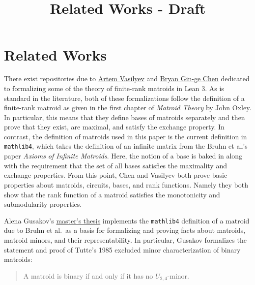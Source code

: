 \documentclass[sigplan,10pt,anonymous,review]{acmart}\settopmatter{printfolios=true,printccs=false,printacmref=false}\usepackage{graphicx} %
\title{Related Works - Draft}
\begin{document}
\maketitle


\section{Related Works}
There exist repositories due to \href{https://github.com/VArtem/lean-matroids}{Artem Vasilyev} and \href{https://github.com/bryangingechen/lean-matroids}{Bryan Gin-ge Chen}
dedicated to formalizing some of the theory of finite-rank matroids in Lean 3. As is standard in the literature, both of these formalizations follow the definition of a
finite-rank matroid as given in the first chapter of \textit{Matroid Theory} by John Oxley. %
In particular, this means that they define bases of matroids separately and then prove that they exist, are maximal, and satisfy the exchange property.
In contrast, the definition of matroids used in this paper is the current definition in \texttt{mathlib4}, which takes the definition of an infinite matrix from the
Bruhn et al.'s paper \textit{Axioms of Infinite Matroids}. Here, the notion of a base is baked in along with the requirement that the set of all bases satisfies the
maximality and exchange properties. From this point, Chen and Vasilyev both prove basic properties about matroids, circuits, bases, and rank functions.
Namely they both show that the rank function of a matroid satisfies the monotonicity and submodularity properties.

Alena Gusakov's \href{https://dspacemainprd01.lib.uwaterloo.ca/server/api/core/bitstreams/fe5957ef-3e10-4493-b11d-8d8121cafeba/content}{master's thesis}
implements the \texttt{mathlib4} definition of a matroid due to Bruhn et al.\ as a basis for formalizing and proving facts about matroids,
matroid minors, and their representability. In particular, Gusakov formalizes the statement and proof of Tutte's 1985 excluded minor characterization of binary matroids:
\begin{quote}
    A matroid is binary if and only if it has no $U_{2,4}$-minor.
\end{quote}
\end{document}
